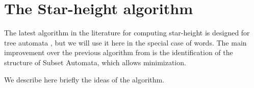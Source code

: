 \newcommand{\cB}{\mathcal B}

\section{The Star-height algorithm}

The latest algorithm in the literature for computing star-height is designed for tree automata \cite{CL08sh}, but we will use it here in the special case of words. The main improvement over the previous algorithm from \cite{Kirsten05} is the identification of the structure of Subset Automata, which allows minimization.

We describe here briefly the ideas of the algorithm.
%
%
%
%

